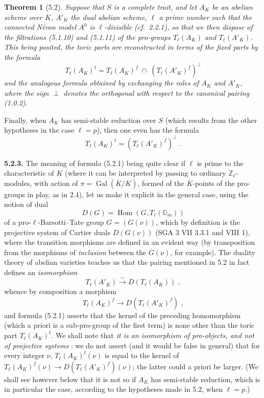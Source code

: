 \documentclass[11pt]{article}
\theoremstyle{plain}
\newtheorem{theoreme}[theorem]{Theorem}
\theoremstyle{definition}
\theoremstyle{remark}
\newcommand{\GG}{\mathbb G}
\newcommand{\ZZ}{\mathbb Z}
\DeclareMathOperator{\Hom}{Hom}
\DeclareMathOperator{\Gal}{Gal}
\newcommand{\Tl}{T_\ell}
\begin{document}
\begin{theoreme}[5.2]
Suppose that $S$ is a complete trait, and let $A_K$ be an abelian scheme
over $K$, $A'_K$ the dual abelian scheme, $\ell$ a prime number such that
the connected N\'eron model $A^0$ is $\ell$-divisible (cf.~2.2.1), so
that we then dispose of the filtrations (5.1.10) and (5.1.11) of the
pro-groups $\Tl(A_K)$ and $\Tl(A'_K)$. This being posited, the toric
parts are reconstructed in terms of the fixed parts by the formula
\begin{equation}
\Tl(A_K)^t = \Tl(A_K)^f \;\cap\; (\Tl(A'_K)^f)^{\perp}
\end{equation}
and the analogous formula obtained by exchanging the roles of $A_K$ and
$A'_K$, where the sign $\perp$ denotes the \emph{orthogonal} with respect
to the \emph{canonical pairing} (1.0.2).
\end{theoreme}

Finally, when $A_K$ has semi-stable reduction over $S$ (which results
from the other hypotheses in the case $\ell = p$), then one even has the
formula
\begin{equation}
\Tl(A_K)^t = (\Tl(A'_K)^f)^{\perp} \; .
\end{equation}

\noindent\textbf{5.2.3.} The meaning of formula (5.2.1) being quite
clear if $\ell$ is prime to the characteristic of $K$ (where it can be
interpreted by passing to ordinary $\ZZ_{\ell}$-modules, with action of
$\pi = \Gal(\overline{K}/K)$, formed of the $\overline{K}$-points of the
pro-groups in play, as in 2.4), let us make it explicit in the general
case, using the notion of dual
\begin{equation}
D(G) = \Hom(G, \Tl(\GG_m))
\end{equation}
of a pro-$\ell$-Barsotti--Tate group $G = (G(\nu))$, which by definition
is the projective system of Cartier duals $D(G(\nu))$ (SGA 3 VII
3.3.1 and VIII 1), where the transition morphisms are defined in an
evident way (by transposition from the morphisms of \emph{inclusion}
between the $G(\nu)$, for example). The duality theory of abelian
varieties teaches us that the pairing mentioned in 5.2 in fact defines
an \emph{isomorphism}
\begin{equation}
\Tl(A'_K) \overset{\sim}{\longrightarrow} D(\Tl(A_K)) \; ,
\end{equation}
whence by composition a morphism
\begin{equation}
\Tl(A_K)^f \longrightarrow D(\Tl(A'_K)^f) \; ,
\end{equation}
and formula (5.2.1) asserts that the kernel of the preceding homomorphism
(which a priori is a sub-pro-group of the first term) is none other than
the toric part $\Tl(A_K)^t$. We shall note that \emph{it is an
isomorphism of pro-objects, and not of projective systems} : we do not
assert (and it would be false in general) that for every integer $\nu$,
$\Tl(A_K)^t(\nu)$ is equal to the kernel of
$\Tl(A_K)^f(\nu) \to D(\Tl(A'_K)^f)(\nu)$; the latter could a priori be
larger. (We shall see however below that it is not so if $A_K$ has
semi-stable reduction, which is in particular the case, according to the
hypotheses made in 5.2, when $\ell = p$.)
\end{document}
